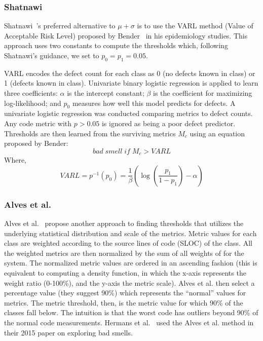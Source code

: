 \documentclass[twocolumn,5p]{elsarticle}
\theoremstyle{break}
\begin{document}
	\subsubsection{ Shatnawi}
	Shatnawi~\cite{Shatnawi10}'s preferred alternative to $\mu+\sigma$
	is to use the VARL method (Value of Acceptable Risk Level) proposed by Bender~\cite{bender99} in his epidemiology studies.  This approach uses two
	constants to compute the thresholds which, following Shatnawi's guidance, we set to
	$p_0=p_1=0.05$.
	
	VARL encodes the defect count
	for each class as 0 (no defects known in class) or 1 (defects known in class).
	Univariate binary logistic regression is applied to learn three coefficients:  
	$\alpha$ is the intercept constant;
	$\beta$ is the coefficient for maximizing log-likelihood;
	and $p_0$ 
	measures   how well this  model predicts for  defects. A univariate logistic regression was conducted comparing metrics to defect counts. Any code metric with $p>0.05$ is ignored as being a poor defect predictor. Thresholds are then learned from the surviving metrics $M_c$ using
	an equation proposed by Bender:
	$$ \mathit{bad\; smell\; if\;} M_c > VARL$$
	Where,
	\begin{equation}
		VARL = p^{-1}(p_0) =  \frac{1}{\beta }\left( {\log \left( {\frac{{{p_1}}}{{1 - {p_1}}}} \right) - \alpha } \right) 
	\end{equation}
	
	
	\subsubsection{ Alves et al.}
	Alves et al.~\cite{Alves2010} propose another approach 
	to finding thresholds that  utilizes the underlying statistical distribution and scale of the metrics. 
	Metric values for each class are weighted according to the source lines of code (SLOC) of the class. All the weighted metrics are then normalized by the sum of all weights of for the system. 
	The normalized metric values are ordered in an ascending fashion (this is equivalent to computing a density function, in which the x-axis represents the weight ratio (0-100\%), and the y-axis the metric scale).
	Alves et al. then select a percentage value (they suggest 90\%) which represents the ``normal'' values for metrics. The metric threshold, then, is the metric value for which 90\% of the classes fall below. The intuition  is that the worst code has outliers beyond 90\% of the normal code measurements. Hermans et al.~\cite{hermans15} used the
	Alves et al. method in their  2015 paper on
	exploring bad smells.
	
\end{document}

